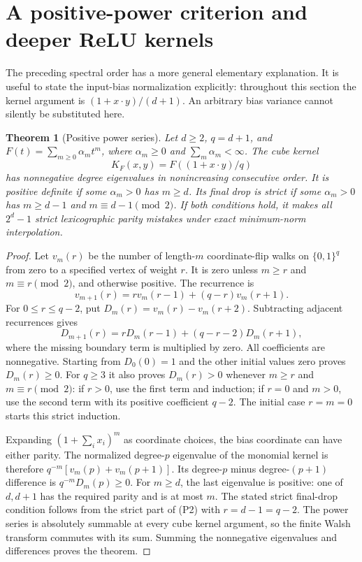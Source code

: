 \documentclass[11pt]{article}
\newtheorem{theorem}{Theorem}\newtheorem{lemma}[theorem]{Lemma}
\begin{document}
\section{A positive-power criterion and deeper ReLU kernels}
\label{sec:deep}
The preceding spectral order has a more general elementary explanation.
It is useful to state the input-bias normalization explicitly: throughout
this section the kernel argument is $(1+x\cdot y)/(d+1)$.
An arbitrary bias variance cannot silently be substituted here.

\begin{theorem}[Positive power series]
\label{thm:powers}
Let $d\ge2$, $q=d+1$, and
$F(t)=\sum_{m\ge0}\alpha_m t^m$, where $\alpha_m\ge0$ and
$\sum_m\alpha_m<\infty$. The cube kernel
\[
                    K_F(x,y)=F((1+x\cdot y)/q)                \tag{P1}
\]
has nonnegative degree eigenvalues in nonincreasing consecutive order.
It is positive definite if some $\alpha_m>0$ has $m\ge d$.
Its final drop is strict if some $\alpha_m>0$ has
$m\ge d-1$ and $m\equiv d-1\pmod2$.
If both conditions hold, it makes all $2^d-1$ strict lexicographic
parity mistakes under exact minimum-norm interpolation.
\end{theorem}
\begin{proof}
Let $v_m(r)$ be the number of length-$m$ coordinate-flip walks on
$\{0,1\}^q$ from zero to a specified vertex of weight $r$.
It is zero unless $m\ge r$ and $m\equiv r\pmod2$, and otherwise
positive. The recurrence is
\[
 v_{m+1}(r)=r v_m(r-1)+(q-r)v_m(r+1).
\]
For $0\le r\le q-2$, put $D_m(r)=v_m(r)-v_m(r+2)$.
Subtracting adjacent recurrences gives
\[
 D_{m+1}(r)=rD_m(r-1)+(q-r-2)D_m(r+1),                        \tag{P2}
\]
where the missing boundary term is multiplied by zero. All coefficients
are nonnegative. Starting from $D_0(0)=1$ and the other initial values
zero proves $D_m(r)\ge0$. For $q\ge3$ it also proves
$D_m(r)>0$ whenever $m\ge r$ and $m\equiv r\pmod2$:
if $r>0$, use the first term and induction; if $r=0$ and $m>0$,
use the second term with its positive coefficient $q-2$.
The initial case $r=m=0$ starts this strict induction.

Expanding $(1+\sum_i x_i)^m$ as coordinate choices, the bias coordinate
can have either parity. The normalized degree-$p$ eigenvalue of the
monomial kernel is therefore
$q^{-m}[v_m(p)+v_m(p+1)]$. Its degree-$p$ minus degree-$(p+1)$
difference is $q^{-m}D_m(p)\ge0$.
For $m\ge d$, the last eigenvalue is positive: one of $d,d+1$ has
the required parity and is at most $m$. The stated strict final-drop
condition follows from the strict part of (P2) with $r=d-1=q-2$.
The power series is absolutely summable at every cube kernel argument,
so the finite Walsh transform commutes with its sum. Summing the
nonnegative eigenvalues and differences proves the theorem.
\end{proof}
\end{document}
